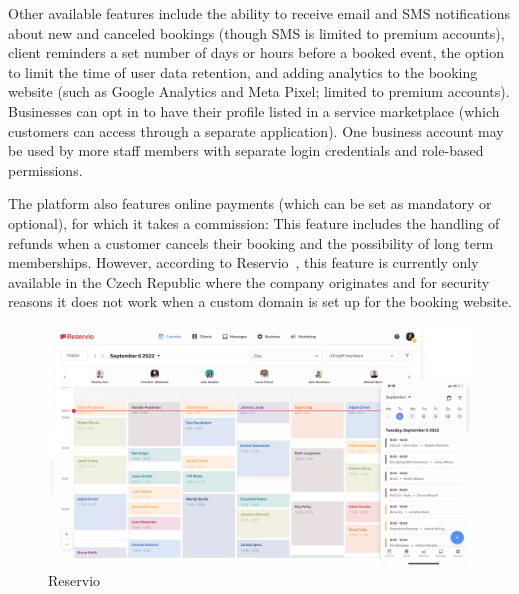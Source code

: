 Other available features include the ability to receive email and SMS notifications about new and canceled bookings (though SMS is limited to premium accounts), client reminders a set number of days or hours before a booked event, the option to limit the time of user data retention, and adding analytics to the booking website (such as Google Analytics and Meta Pixel; limited to premium accounts). Businesses can opt in to have their profile listed in a service marketplace (which customers can access through a separate application). One business account may be used by more staff members with separate login credentials and role-based permissions.

The platform also features online payments (which can be set as mandatory or optional), for which it takes a commission: This feature includes the handling of refunds when a customer cancels their booking and the possibility of long term memberships. However, according to Reservio~\cite{reservio}, this feature is currently only available in the Czech Republic where the company originates and for security reasons it does not work when a custom domain is set up for the booking website.

\begin{figure}
    \centering
    \includegraphics[width=1.0\textwidth]{content/existing_reservation_systems/reservio.png}
    \caption[Reservio]{Reservio~\cite{reservio}}
    \label{fig:reservio}
\end{figure}
